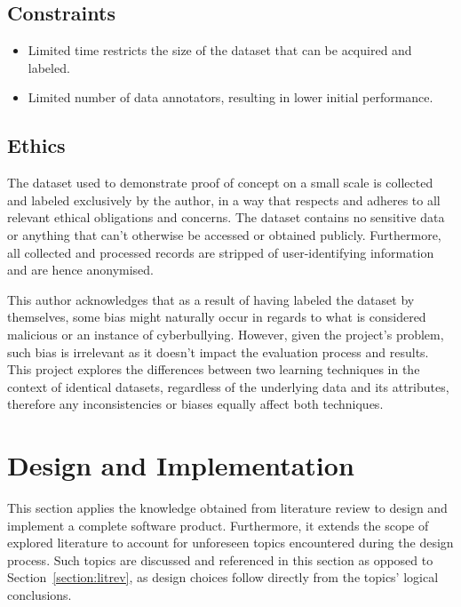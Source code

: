 \documentclass[a4paper,12pt]{article}
\begin{document}
    \subsection{Constraints}
    \begin{itemize}
        \item Limited time restricts the size of the dataset that can be acquired and labeled.
        \item Limited number of data annotators, resulting in lower initial performance.
    \end{itemize}
\newpage
\subsection{Ethics}
The dataset used to demonstrate proof of concept on a small scale is collected and labeled exclusively by the author, in a way that respects and adheres to all relevant ethical obligations and concerns. The dataset contains no sensitive data or anything that can't otherwise be accessed or obtained publicly. Furthermore, all collected and processed records are stripped of user-identifying information and are hence anonymised.

This author acknowledges that as a result of having labeled the dataset by themselves, some bias might naturally occur in regards to what is considered malicious or an instance of cyberbullying. However, given the project's problem, such bias is irrelevant as it doesn't impact the evaluation process and results. This project explores the differences between two learning techniques in the context of identical datasets, regardless of the underlying data and its attributes, therefore any inconsistencies or biases equally affect both techniques.
\newpage
\section{Design and Implementation}
This section applies the knowledge obtained from literature review to design and implement a complete software product. Furthermore, it extends the scope of explored literature to account for unforeseen topics encountered during the design process. Such topics are discussed and referenced in this section as opposed to Section~\ref{section:litrev}, as design choices follow directly from the topics' logical conclusions.
\end{document}
